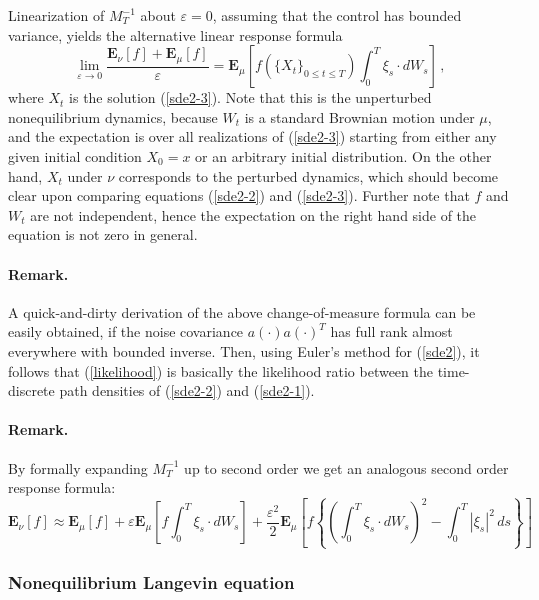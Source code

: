 \documentclass[]{tMPH2e}
\newcommand{\eps}{\varepsilon}
\newcommand{\bE}{{\mathbf E}}
\begin{document}
Linearization of $M_{T}^{-1}$ about $\eps=0$, assuming that the control has bounded variance, yields the alternative linear response formula 
\begin{equation}\label{lr-alt}
\lim_{\eps\to 0}\frac{\bE_{\nu}[f] + \bE_{\mu}[f]}{\eps} = \bE_{\mu}\left[f(\{X_{t}\}_{0\le t\le T})\int_{0}^{T}\xi_{s}\cdot dW_{s} \right]\,,
\end{equation}
where $X_{t}$ is the solution (\ref{sde2-3}). Note that this is the unperturbed nonequilibrium dynamics, because $W_{t}$ is a standard Brownian motion under $\mu$, and the expectation is over all realizations of (\ref{sde2-3}) starting from either any given initial condition $X_{0}=x$ or an arbitrary initial distribution. On the other hand, $X_{t}$ under $\nu$ corresponds to the perturbed dynamics, which should become clear upon comparing equations (\ref{sde2-2}) and (\ref{sde2-3}). Further note that $f$ and $W_{t}$ are not independent, hence the expectation on the right hand side of the equation is not zero in general. 


\paragraph*{Remark.} A quick-and-dirty derivation of the above change-of-measure formula can be easily obtained, if the noise covariance $a(\cdot)a(\cdot)^{T}$ has full rank almost everywhere with bounded inverse. Then, using Euler's method for (\ref{sde2}), it follows that (\ref{likelihood}) is basically the likelihood ratio between the time-discrete path densities of (\ref{sde2-2}) and (\ref{sde2-1}).    

\paragraph*{Remark.} By formally expanding $M^{-1}_T$ up to second order we get an analogous second order response formula: 
\begin{equation}\label{2nd}
\bE_{\nu}[f] \approx \bE_{\mu}[f] + \eps \bE_{\mu}\left[f\int_{0}^{T}\xi_{s}\cdot dW_{s} \right] +\frac{\eps^{2}}{2} \bE_{\mu}\left[f\left\{\left(\int_{0}^{T}\xi_{s}\cdot dW_{s}\right)^2 -\int_0^T |\xi_s|^2\,ds\right\} \right]
\end{equation}
 





\subsubsection*{Nonequilibrium Langevin equation}
\end{document}
